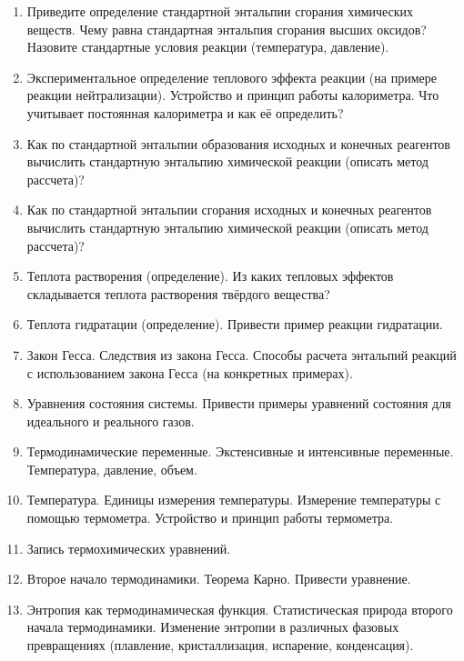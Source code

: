 \begin{enumerate}
\item 
Приведите определение стандартной энтальпии сгорания химических веществ. Чему равна стандартная энтальпия сгорания высших оксидов? Назовите стандартные условия реакции (температура, давление).
 
\item 
Экспериментальное определение теплового эффекта реакции (на примере реакции нейтрализации). Устройство и принцип работы калориметра. Что учитывает постоянная калориметра и как её определить?
 
\item 
Как по стандартной энтальпии образования исходных и конечных реагентов вычислить стандартную энтальпию химической реакции (описать метод рассчета)?
 
\item 
Как по стандартной энтальпии сгорания исходных и конечных реагентов вычислить стандартную энтальпию химической реакции (описать метод рассчета)?
 
\item 
Теплота растворения (определение). Из каких тепловых эффектов складывается  теплота  растворения твёрдого вещества?
 
\item 
Теплота гидратации (определение). Привести пример реакции гидратации.
 
\item 
Закон Гесса. Следствия из закона Гесса. Способы расчета энтальпий реакций с использованием закона Гесса (на конкретных примерах).
 
\item 
Уравнения состояния системы. Привести примеры уравнений состояния для идеального и реального газов. 
 
\item 
Термодинамические переменные. Экстенсивные и интенсивные переменные. Температура, давление, объем.
 
\item 
Температура. Единицы измерения температуры. Измерение температуры с помощью термометра. Устройство и принцип работы термометра.
 
\item 
Запись термохимических уравнений.
 
\item 
Второе начало термодинамики. Теорема Карно. Привести уравнение.
 
\item 
Энтропия как термодинамическая функция. Статистическая природа второго начала термодинамики. Изменение энтропии в различных фазовых превращениях (плавление, кристаллизация, испарение, конденсация).
 

\end{enumerate}
